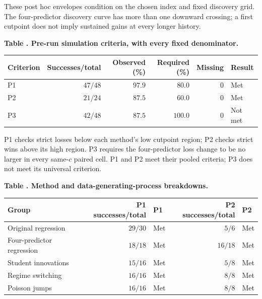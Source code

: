 \noindent\begin{minipage}{0.98\linewidth}\scriptsize These post hoc envelopes condition on the chosen index and fixed discovery grid. The four-predictor discovery curve has more than one downward crossing; a first cutpoint does not imply sustained gains at every longer history.\end{minipage}\par\smallskip
\par\medskip{}\label{tab:v9-confirmation-pooled}
\noindent\textbf{Table \thetable. Pre-run simulation criteria, with every fixed denominator.}\par
\begin{center}\begin{tabular}{lrrrrl}
\toprule
Criterion & Successes/total & Observed (\%) & Required (\%) & Missing & Result \\
\midrule
P1 & $47/48$ & $97.9$ & $80.0$ & $0$ & Met \\ %
P2 & $21/24$ & $87.5$ & $60.0$ & $0$ & Met \\ %
P3 & $42/48$ & $87.5$ & $100.0$ & $0$ & Not met \\ %
\bottomrule
\end{tabular}\end{center}
\noindent\begin{minipage}{0.98\linewidth}\scriptsize P1 checks strict losses below each method's low cutpoint region; P2 checks strict wins above its high region. P3 requires the four-predictor loss change to be no larger in every same-$c$ paired cell. P1 and P2 meet their pooled criteria; P3 does not meet its universal criterion.\end{minipage}\par\smallskip
\par\medskip{}\label{tab:v9-confirmation-subgroups}
\noindent\textbf{Table \thetable. Method and data-generating-process breakdowns.}\par
\begin{center}\begin{tabular}{p{38mm}rlrl}
\toprule
Group & P1 successes/total & P1 & P2 successes/total & P2 \\
\midrule
Original regression & $29/30$ & Met & $5/6$ & Met \\ %
Four-predictor regression & $18/18$ & Met & $16/18$ & Met \\ %
Student innovations & $15/16$ & Met & $5/8$ & Met \\ %
Regime switching & $16/16$ & Met & $8/8$ & Met \\ %
Poisson jumps & $16/16$ & Met & $8/8$ & Met \\ %
\bottomrule
\end{tabular}\end{center}
\clearpage
